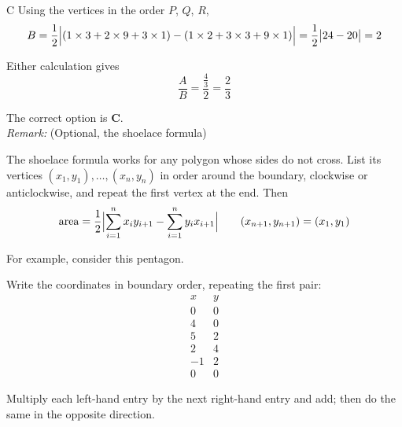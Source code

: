 \documentclass[11pt,a4paper]{article}
\begin{document}
\begin{enumerate}[label=\textbf{\arabic*.},leftmargin=*,itemsep=0pt,start=13]
\begin{djsSolution}{C}
Using the vertices in the order $P$, $Q$, $R$,
\[
B=\frac12\Bigl|(1\times3+2\times9+3\times1)
-(1\times2+3\times3+9\times1)\Bigr|
=\frac12\bigl|24-20\bigr|=2
\]

Either calculation gives
\[
\frac{A}{B}=\frac{\frac43}{2}=\frac23
\]

The correct option is \textbf{C}. \\[5pt]

\textit{Remark:} (Optional, the shoelace formula)

The shoelace formula works for any polygon whose sides do not cross. List its vertices $(x_1,y_1),\ldots,(x_n,y_n)$ in order around the boundary, clockwise or anticlockwise, and repeat the first vertex at the end. Then
\[
\text{area}
=\frac12\Bigl|
\sum_{i=1}^{n}x_i y_{i+1}
-\sum_{i=1}^{n}y_i x_{i+1}
\Bigr|
\qquad
(x_{n+1},y_{n+1})=(x_1,y_1)
\]

For example, consider this pentagon.

\begin{djsSolutionFigure}
\end{djsSolutionFigure}

Write the coordinates in boundary order, repeating the first pair:
\[
\begin{array}{c|r}
x&y\\ \hline
0&0\\
4&0\\
5&2\\
2&4\\
-1&2\\
0&0
\end{array}
\]

Multiply each left-hand entry by the next right-hand entry and add; then do the same in the opposite direction. 


\end{djsSolution}
\end{enumerate}
\end{document}
